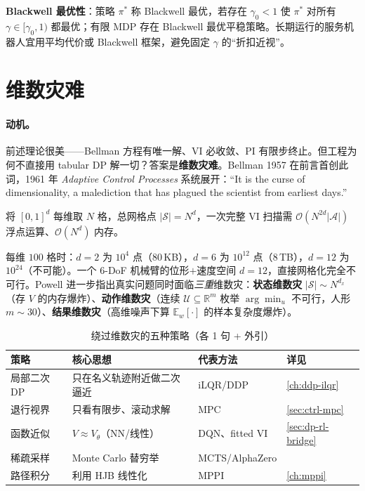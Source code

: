 \textbf{Blackwell 最优性}\cite{blackwell1962discrete}：策略 $\pi^*$ 称 Blackwell 最优，若存在 $\gamma_0<1$ 使 $\pi^*$ 对所有 $\gamma\in[\gamma_0,1)$ 都最优；有限 MDP 存在 Blackwell 最优平稳策略。长期运行的服务机器人宜用平均代价或 Blackwell 框架，避免固定 $\gamma$ 的“折扣近视”。

\section{维数灾难}
\label{sec:dp-curse}

\paragraph{动机。}
前述理论很美——Bellman 方程有唯一解、VI 必收敛、PI 有限步终止。但工程为何不直接用 tabular DP 解一切？答案是\textbf{维数灾难}。Bellman 1957 在前言首创此词，1961 年 \emph{Adaptive Control Processes} 系统展开：“It is the curse of dimensionality, a malediction that has plagued the scientist from earliest days.”

\begin{proposition}[网格化的指数爆炸]\label{prop:dp-curse}
将 $[0,1]^d$ 每维取 $N$ 格，总网格点 $|\mathcal S|=N^d$，一次完整 VI 扫描需 $\mathcal O(N^{2d}|\mathcal A|)$ 浮点运算、$\mathcal O(N^d)$ 内存。
\end{proposition}

每维 $100$ 格时：$d=2$ 为 $10^4$ 点（$80$\,KB），$d=6$ 为 $10^{12}$ 点（$8$\,TB），$d=12$ 为 $10^{24}$（不可能）。一个 6-DoF 机械臂的位形$+$速度空间 $d=12$，直接网格化完全不可行。Powell 进一步指出真实问题同时面临\emph{三重}维数灾\cite{powell2011adp}：\textbf{状态维数灾} $|\mathcal S|\sim N^{d_x}$（存 $V$ 的内存爆炸）、\textbf{动作维数灾}（连续 $\mathcal U\subseteq\mathbb R^m$ 枚举 $\arg\min_u$ 不可行，人形 $m\sim30$）、\textbf{结果维数灾}（高维噪声下算 $\mathbb E_w[\cdot]$ 的样本复杂度爆炸）。

\begin{table}[H]\centering\small
\caption{绕过维数灾的五种策略（各 1 句 + 外引）}
\label{tab:dp-mitigation}
\begin{tabular}{llll}
\toprule
策略 & 核心思想 & 代表方法 & 详见 \\
\midrule
局部二次 DP & 只在名义轨迹附近做二次逼近 & iLQR/DDP & \cref{ch:ddp-ilqr} \\
退行视界 & 只看有限步、滚动求解 & MPC & \cref{sec:ctrl-mpc} \\
函数近似 & $V\approx V_\theta$（NN/线性） & DQN、fitted VI & \cref{sec:dp-rl-bridge} \\
稀疏采样 & Monte Carlo 替穷举 & MCTS/AlphaZero & \cite{sutton2018rl} \\
路径积分 & 利用 HJB 线性化 & MPPI & \cref{ch:mppi} \\
\bottomrule
\end{tabular}
\end{table}

